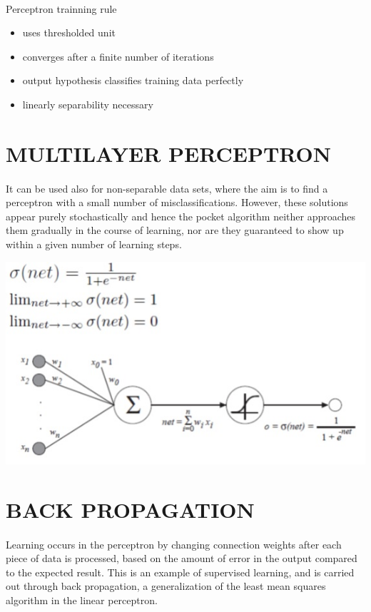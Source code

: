 \documentclass[11pt,a4paper,twoside]{report}
\begin{document}
\paragraph{ }Perceptron trainning rule
\begin{itemize}
\item uses thresholded unit
\item converges after a finite number of iterations
\item output hypothesis classifies training data perfectly
\item linearly separability necessary
\end{itemize}
\section{MULTILAYER PERCEPTRON }
\paragraph{ }It can be used also for non-separable data sets, where the aim is to find a perceptron with a small number of misclassifications. However, these solutions appear purely stochastically and hence the pocket algorithm neither approaches them gradually in the course of learning, nor are they guaranteed to show up within a given number of learning steps.
\begin{center}
\includegraphics[scale=.75]{mlp.jpg}
\end{center}

\section{BACK PROPAGATION}
\paragraph{ }Learning occurs in the perceptron by changing connection weights after each piece of data is processed, based on the amount of error in the output compared to the expected result. This is an example of supervised learning, and is carried out through back propagation, a generalization of the least mean squares algorithm in the linear perceptron.
\end{document}

